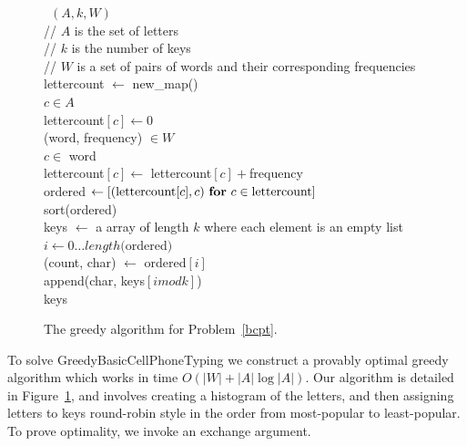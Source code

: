\documentclass[runningheads]{llncs}
\begin{document}
\begin{figure}
\begin{algorithm}
~$(A, k, W)$\+\\
    // $A$ is the set of letters \\
    // $k$ is the number of keys \\
    // $W$ is a set of pairs of words and their corresponding frequencies \\
    lettercount $\gets$ new\_map() \\
    \For $c \in A$\+\\
        lettercount$[c] \gets 0$\-\\
    \For (word, frequency) $\in W$\+\\
        \For $c \in$ word \+\\
            lettercount$[c] \gets $ lettercount$[c] +$frequency\-\-\\
    ordered $\gets \left[ ({\rm lettercount}[c], c)~\For c \in {\rm lettercount} \right]$\\
    sort(ordered)\\
    keys $\gets$ a array of length $k$ where each element is an empty list\\
    \For $i \gets 0 \ldots length($ordered$)$\+\\
        (count, char) $\gets$ ordered$[i]$\\
        append(char, keys$[i mod k]$)\-\\
    \Return keys
\end{algorithm}
\caption{The greedy algorithm for Problem~\ref{bcpt}.}
\label{greedyalg}
\end{figure}

To solve {\sc GreedyBasicCellPhoneTyping} we construct a provably optimal
greedy algorithm which works in time $O(|W| + |A| \log |A|)$.  Our algorithm is
detailed in Figure~\ref{greedyalg}, and involves creating a histogram of the
letters, and then assigning letters to keys round-robin style in the order from
most-popular to least-popular.  To prove optimality, we invoke an exchange argument.
\end{document}
